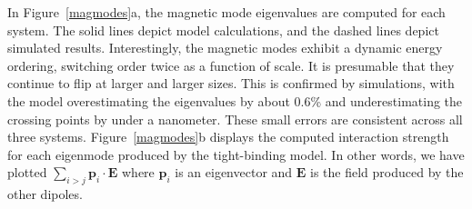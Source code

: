 \documentclass[journal=apchd5,manuscript=article]{achemso}
\begin{document}
In Figure~\ref{magmodes}a, the magnetic mode eigenvalues are computed for each system. The solid lines depict model calculations, and the dashed lines depict simulated results. Interestingly, the magnetic modes exhibit a dynamic energy ordering, switching order twice as a function of scale. It is presumable that they continue to flip at larger and larger sizes. This is confirmed by simulations, with the model overestimating the eigenvalues by about 0.6\% and underestimating the crossing points by under a nanometer. These small errors are consistent across all three systems. Figure~\ref{magmodes}b displays the computed interaction strength for each eigenmode produced by the tight-binding model. In other words, we have plotted $\sum_{i>j}\textbf{p}_{i}\cdot\textbf{E}$ where $\textbf{p}_{i}$ is an eigenvector and $\textbf{E}$ is the field produced by the other dipoles.
\end{document}
